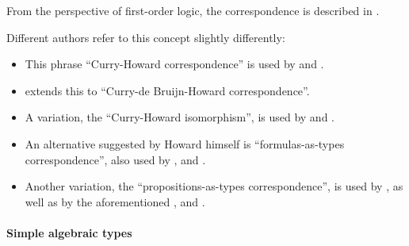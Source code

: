 \begin{comments}
  \item From the perspective of first-order logic, the correspondence is described in .

  \item Different authors refer to this concept slightly differently:
  \begin{itemize}
    \item This phrase \enquote{Curry-Howard correspondence} is used by  and .

    \item {} extends this to \enquote{Curry-de Bruijn-Howard correspondence}.

    \item A variation, the \enquote{Curry-Howard isomorphism}, is used by  and .

    \item  An alternative suggested by Howard himself is \enquote{formulas-as-types correspondence}, also used by ,  and .

    \item Another variation, the \enquote{propositions-as-types correspondence}, is used by , as well as by the aforementioned ,  and .
  \end{itemize}
\end{comments}

\paragraph{Simple algebraic types}

